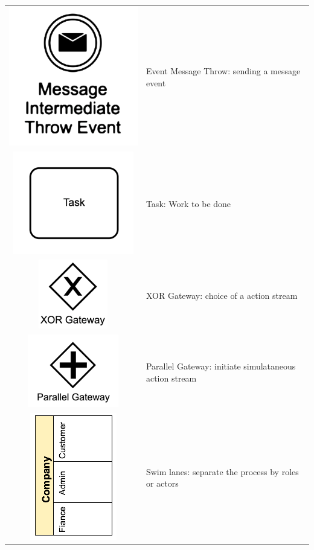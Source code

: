 \documentclass[]{book}
\begin{document}
\begin{longtable}[]{@{}cl@{}}
\includegraphics{images/event-message-throw.png} & Event Message Throw: sending a message event\tabularnewline
\includegraphics{images/task.png} & Task: Work to be done\tabularnewline
\includegraphics{images/xor-gateway.png} & XOR Gateway: choice of a action stream\tabularnewline
\includegraphics{images/parallel-gateway.png} & Parallel Gateway: initiate simulataneous action stream\tabularnewline
\includegraphics{images/swimlanes.png} & Swim lanes: separate the process by roles or actors\tabularnewline
\bottomrule
\end{longtable}
\end{document}

